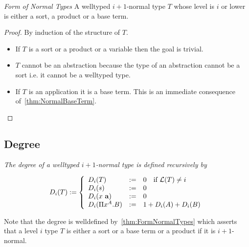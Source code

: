 \begin{theorem}
    \label{thm:FormNormalTypes}
    \emph{Form of Normal Types} A welltyped $i+1$-normal type $T$ whose level is
    $i$ or lower is either a sort, a product or a base term.


    \begin{proof}
        By induction of the structure of $T$.
        \begin{itemize}

            \item If $T$ is a sort or a product or a variable then the goal is
                trivial.

            \item $T$ cannot be an abstraction because the type of an
                abstraction cannot be a sort i.e. it cannot be a welltyped type.

            \item If $T$ is an application it is a base term. This is an
                immediate consequence of~\ref{thm:NormalBaseTerm}.
        \end{itemize}
    \end{proof}
\end{theorem}



\subsection{Degree}

\begin{definition}
    \label{def:TypeDegree}
    \emph{The degree of a welltyped $i+1$-normal type is defined recursively by}

    $$
    D_i(T) :=
    \dcases{
        D_i(T) &:=& 0 \quad\text{if } \Level(T) \ne i
        \\
        D_i(s) &:=& 0
        \\
        D_i(x \vec a) &:=& 0
        \\
        D_i(\Pi x^A.B) &:=&
        1 + D_i(A) +  D_i(B)
    }
    $$

    Note that the degree is welldefined by~\ref{thm:FormNormalTypes} which
    asserts that a level $i$ type $T$ is either a sort or a base term or a
    product if it is $i+1$-normal.
\end{definition}



